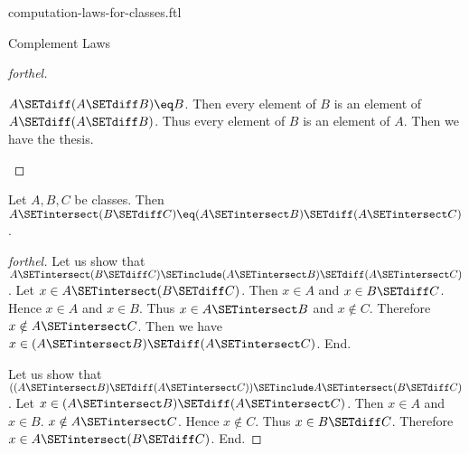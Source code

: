 \documentclass{naproche-library}
\begin{document}
\begin{smodule}[title=Computation Laws For Classes]{computation-laws-for-classes.ftl}
\begin{sfragment}{Complement Laws}
\begin{proof}[forthel]
    \begin{case}{$A \SETdiff (A \SETdiff B) \eq B$.}
      Then every element of $B$ is an element of $A \SETdiff (A \SETdiff B)$.
      Thus every element of $B$ is an element of $A$.
      Then we have the thesis.
    \end{case}
  \end{proof}

  \begin{proposition}[forthel,id=FOUNDATIONS_02_5811954316738560]
    Let $A, B, C$ be classes.
    Then $A \SETintersect (B \SETdiff C) \eq (A \SETintersect B) \SETdiff (A \SETintersect C)$.
  \end{proposition}
  \begin{proof}[forthel]
    Let us show that $A \SETintersect (B \SETdiff C) \SETinclude (A \SETintersect B) \SETdiff (A \SETintersect C)$.
      Let $x \in A \SETintersect (B \SETdiff C)$.
      Then $x \in A$ and $x \in B \SETdiff C$.
      Hence $x \in A$ and $x \in B$.
      Thus $x \in A \SETintersect B$ and $x \notin C$.
      Therefore $x \notin A \SETintersect C$.
      Then we have $x \in (A \SETintersect B) \SETdiff (A \SETintersect C)$.
    End.

    Let us show that $((A \SETintersect B) \SETdiff (A \SETintersect C)) \SETinclude A \SETintersect (B \SETdiff C)$. %
      Let $x \in (A \SETintersect B) \SETdiff (A \SETintersect C)$.
      Then $x \in A$ and $x \in B$.
      $x \notin A \SETintersect C$.
      Hence $x \notin C$.
      Thus $x \in B \SETdiff C$.
      Therefore $x \in A \SETintersect (B \SETdiff C)$.
    End.
  \end{proof}
\end{sfragment}
\end{smodule}
\end{document}
